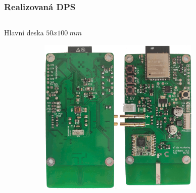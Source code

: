 \documentclass[%
  12pt,       				%
	t,                  %
	aspectratio=1610,   %
	unicode,						%
]{beamer}				    	%
\begin{document}
\begin{frame}
\begin{columns}
\begin{column}{0.5\textwidth}
		\end{column}
	\end{columns}
\end{frame}


\begin{frame}
	\frametitle{Realizovaná DPS}
	\begin{columns}
		\begin{column}{0.6\textwidth}
			\centering
			Hlavní deska $50x100~mm$
			\begin{figure}
				\centering
				\begin{figure}
					\includegraphics[width=0.85\textwidth]{obrazky/final_pcb_both.png}
				\end{figure}
			\end{figure}
		\end{column}


\end{columns}
\end{frame}
\end{document}
